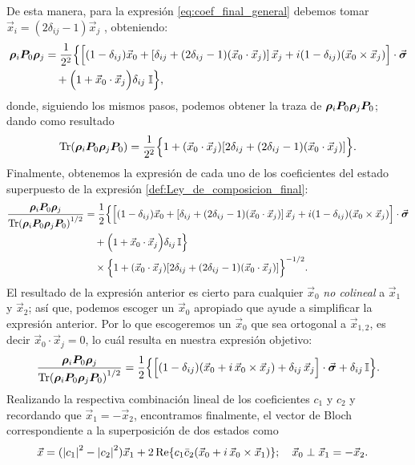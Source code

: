 \documentclass[../Main.tex]{subfiles}
\begin{document}
De esta manera, para la expresión \eqref{eq:coef_final_general} debemos tomar $\vec{x}_i=(2\delta_{ij}-1)\vec{x}_j$ , obteniendo:
\begin{align}
\bm{\rho}_i \bm{P}_0 \bm{\rho}_j 
&=
\frac{1}{2^2}\Big\{
\Big[
(1-\delta_{ij})\vec{x}_0 + \qty[\delta_{ij}+(2\delta_{ij}-1)(\vec{x}_0\cdot \vec{x}_j)]\,\vec{x}_j + i(1-\delta_{ij})(\vec{x}_0\times \vec{x}_j)
\Big]\cdot\vec{\bm{\sigma}}
\notag\\
&\quad +
\Big(
1 + \vec{x}_0\cdot \vec{x}_j 
\Big)\delta_{ij}\;\mathbb{I}
\Big\},
\end{align}
donde, siguiendo los mismos pasos, podemos obtener la traza de $\bm{\rho}_i \bm{P}_0 \bm{\rho}_j \bm{P}_0$; dando como resultado 
\begin{equation}
\Tr(\bm{\rho}_i \bm{P}_0 \bm{\rho}_j \bm{P}_0)
=
\frac{1}{2^2}
\Big\{
1 + (\vec{x}_0\cdot \vec{x}_j)\qty[
2\delta_{ij} + (2\delta_{ij}-1)(\vec{x}_0\cdot \vec{x}_j)
]
\Big\}.
\end{equation}
Finalmente, obtenemos la expresión de cada uno de los coeficientes del estado superpuesto de la expresión \eqref{def:Ley_de_composicion_final}:
\begin{align}
\frac{\bm{\rho}_i \bm{P}_0 \bm{\rho}_j}{\Tr(\bm{\rho}_i \bm{P}_0 \bm{\rho}_j \bm{P}_0)^{1/2}}
&=
\frac{1}{2}
\Big\{
\Big[
(1-\delta_{ij})\vec{x}_0
+ \qty[\delta_{ij}+(2\delta_{ij}-1)(\vec{x}_0\cdot \vec{x}_j)]\,\vec{x}_j
+ i(1-\delta_{ij})(\vec{x}_0\times \vec{x}_j)
\Big]\cdot\vec{\bm{\sigma}}
\notag\\
&\quad +
\Big(
1 + \vec{x}_0\cdot \vec{x}_j 
\Big)\delta_{ij}\,\mathbb{I}
\Big\}
\notag\\
&\quad \times
\Big\{
1 + (\vec{x}_0\cdot \vec{x}_j)\qty[
2\delta_{ij} + (2\delta_{ij}-1)(\vec{x}_0\cdot \vec{x}_j)
]
\Big\}^{-1/2}.
\end{align}
El resultado de la expresión anterior es cierto para cualquier $\vec{x}_0$ \emph{no colineal} a $\vec{x}_1$ y $\vec{x}_2$; así que, podemos escoger un $\vec{x}_0$ apropiado que ayude a simplificar la expresión anterior. Por lo que escogeremos un $\vec{x}_0$ que sea ortogonal a $\vec{x}_{1,2}$, es decir $\vec{x}_0\cdot \vec{x}_j=0$, lo cuál resulta en nuestra expresión objetivo:
\begin{equation}
\frac{\bm{\rho}_i \bm{P}_0 \bm{\rho}_j}{\Tr(\bm{\rho}_i \bm{P}_0 \bm{\rho}_j \bm{P}_0)^{1/2}}
=
\frac{1}{2}
\Big\{
\Big[
(1-\delta_{ij})(\vec{x}_0+i\,\vec{x}_0\times \vec{x}_j)
+ \delta_{ij}\,\vec{x}_j
\Big]\cdot\vec{\bm{\sigma}}
+ \delta_{ij}\,\mathbb{I}
\Big\}.
\end{equation}
Realizando la respectiva combinación lineal de los coeficientes $c_1$ y $c_2$ y recordando que $\vec{x}_1=-\vec{x}_2$, encontramos finalmente, el vector de Bloch correspondiente a la superposición de dos estados como 
\begin{equation}
\vec{x} = (\abs{c_1}^2-\abs{c_2}^2)\vec{x}_1+2\Re\!\qty{
c_1\bar{c}_2(\vec{x}_0+i\,\vec{x}_0\times \vec{x}_1)
};\qq{$\vec{x}_0\perp \vec{x}_1=-\vec{x}_2$.}
\label{eq:vector_bloch_superposicion}
\end{equation}
\end{document}
